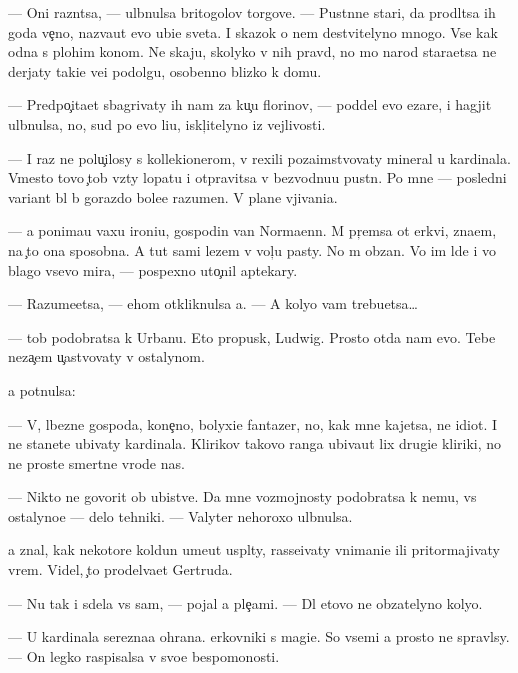 \documentclass[10pt]{book}
\begin{document}
— Oni razn{\ia}tsa, — ul{\yi}bnulsa britogolov{\yi}{\y} torgove{\q}. — Pust{\yi}nn{\yi}{\y}e star{\q}i, da prodl{\ia}tsa ih goda ve{\c}no, naz{\yi}va{\y}ut {\y}evo ubi{\y}{\q}e{\y} sveta. I skazok o nem de{\y}stvitelyno mnogo. Vse kak odna s plohim kon{\q}om. Ne skaju, skolyko v nih pravd{\yi}, no mo{\y} narod stara{\y}etsa ne derjaty taki{\y}e ve{\x}i podolgu, osobenno blizko k domu.

— Predpo{\c}ita{\y}et sbagrivaty ih nam za ku{\c}u florinov, — poddel {\y}evo {\C}ezare, i hagjit ul{\yi}bnulsa, no, sud{\ia} po {\y}evo li{\q}u, iskl{\iu}{\c}itelyno iz vejlivosti.

— I raz ne polu{\c}ilosy s kollek{\q}ionerom, v{\yi} rexili poza{\y}imstvovaty mineral u kardinala. Vmesto tovo {\c}tob{\yi} vz{\ia}ty lopatu i otpravitsa v bezvodnu{\y}u pust{\yi}n{\iu}. Po mne — posledni{\y} variant b{\yi}l b{\yi} gorazdo bole{\y}e razumen. V plane v{\yi}jivani{\y}a.

— {\Y}a ponima{\y}u vaxu ironi{\y}u, gospodin van Norma{\y}enn. M{\yi} pr{\ia}{\c}emsa ot {\Q}erkvi, zna{\y}em, na {\c}to ona sposobna. A tut sami lezem v vol{\c}{\y}u pasty. No m{\yi} ob{\ia}zan{\yi}. Vo im{\ia} l{\iu}de{\y} i vo blago vsevo mira, — pospexno uto{\c}nil aptekary.

— Razume{\y}etsa, — ehom otkliknulsa {\y}a. — A koly{\q}o vam trebu{\y}etsa…

— {\C}tob{\yi} podobratsa k Urbanu. Eto propusk, Ludwig. Prosto otda{\y} nam {\y}evo. Tebe neza{\c}em u{\c}astvovaty v ostalynom.

{\Y}a pot{\ia}nulsa:

— V{\yi}, l{\iu}bezn{\yi}{\y}e gospoda, kone{\c}no, bolyxi{\y}e fantazer{\yi}, no, kak mne kajetsa, ne idiot{\yi}. I ne stanete ubivaty kardinala. Klirikov takovo ranga ubiva{\y}ut lix drugi{\y}e kliriki, no ne prost{\yi}{\y}e smertn{\yi}{\y}e vrode nas.

— Nikto ne govorit ob ubi{\y}stve. Da{\y} mne vozmojnosty podobratsa k nemu, vs{\e} ostalyno{\y}e — delo tehniki. — Valyter nehoroxo ul{\yi}bnulsa.

{\Y}a znal, kak nekotor{\yi}{\y}e koldun{\yi} ume{\y}ut us{\yi}pl{\ia}ty, rasse{\y}ivaty vnimani{\y}e ili pritormajivaty vrem{\ia}. Videl, {\c}to prodel{\yi}va{\y}et Gertruda.

— Nu tak i sdela{\y} vs{\e} sam, — pojal {\y}a ple{\c}ami. — Dl{\ia} etovo ne ob{\ia}zatelyno koly{\q}o.

— U kardinala ser{\y}ezna{\y}a ohrana. {\Q}erkovniki s magi{\y}e{\y}. So vsemi {\y}a prosto ne spravl{\iu}sy. — On legko raspisalsa v svo{\y}e{\y} bespomo{\x}nosti.
\end{document}

